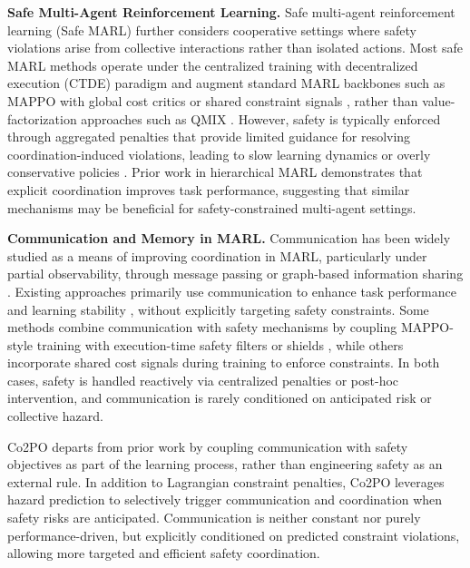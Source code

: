 \documentclass{article}
\theoremstyle{plain}
\theoremstyle{definition}
\theoremstyle{remark}
\begin{document}
\textbf{Safe Multi-Agent Reinforcement Learning.} Safe multi-agent reinforcement learning (Safe MARL) further considers cooperative settings where safety violations arise from collective interactions rather than isolated actions. Most safe MARL methods operate under the centralized training with decentralized execution (CTDE) paradigm and augment standard MARL backbones such as MAPPO with global cost critics or shared constraint signals \cite{hernandezleal2019surveylearningmultiagentenvironments, foerster2024counterfactualmultiagentpolicygradients}, rather than value-factorization approaches such as QMIX \cite{sunehag2017valuedecompositionnetworkscooperativemultiagent, rashid2018qmixmonotonicvaluefunction}. However, safety is typically enforced through aggregated penalties that provide limited guidance for resolving coordination-induced violations, leading to slow learning dynamics or overly conservative policies \cite{gu2023macpo}. Prior work in hierarchical MARL demonstrates that explicit coordination improves task performance, suggesting that similar mechanisms may be beneficial for safety-constrained multi-agent settings.



\textbf{Communication and Memory in MARL.} Communication has been widely studied as a means of improving coordination in MARL, particularly under partial observability, through message passing or graph-based information sharing \cite{sukhbaatar2016learningmultiagentcommunicationbackpropagation, kim2019schednet, das2020tarmactargetedmultiagentcommunication, jiang2020graphconvolutionalreinforcementlearning}.
Existing approaches primarily use communication to enhance task performance and learning stability 
\cite{peng2021copo,calzolari2026safeheterogeneousmultiagentrl}, without explicitly targeting safety constraints. Some methods combine communication with safety mechanisms by coupling MAPPO-style training with execution-time safety filters or shields \cite{alshiekh2017safereinforcementlearningshielding}, while others incorporate shared cost signals during training to enforce constraints.
In both cases, safety is handled reactively via centralized penalties or post-hoc intervention, and communication is rarely conditioned on anticipated risk or collective hazard.

Co2PO departs from prior work by coupling communication with safety objectives as part of the learning process, rather than engineering safety as an external rule. In addition to Lagrangian constraint penalties, Co2PO leverages hazard prediction to selectively trigger communication and coordination when safety risks are anticipated. Communication is neither constant nor purely performance-driven, but explicitly conditioned on predicted constraint violations, allowing more targeted and efficient safety coordination.
\end{document}
